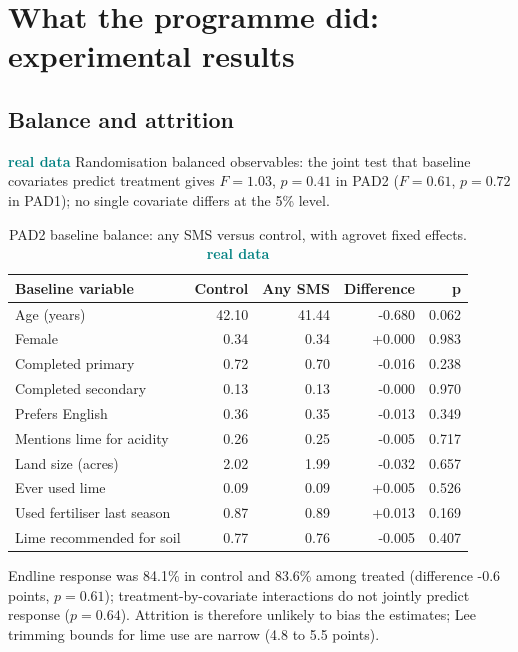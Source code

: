 \documentclass[11pt,a4paper]{article}
\newcommand{\real}{\textcolor{teal}{\sffamily\bfseries real data}}
\begin{document}
\section{What the programme did: experimental results}\label{sec:impact}
\subsection{Balance and attrition}
\real{} Randomisation balanced observables: the joint test that baseline covariates predict treatment gives $F=1.03$, $p=0.41$ in PAD2 ($F=0.61$, $p=0.72$ in PAD1); no single covariate differs at the 5\% level.
\begin{table}[H]\centering\small\setlength{\tabcolsep}{5pt}\begin{tabular}{lrrrr}
\toprule
Baseline variable & Control & Any SMS & Difference & p \\
\midrule
Age (years) & 42.10 & 41.44 & -0.680 & 0.062 \\
Female & 0.34 & 0.34 & +0.000 & 0.983 \\
Completed primary & 0.72 & 0.70 & -0.016 & 0.238 \\
Completed secondary & 0.13 & 0.13 & -0.000 & 0.970 \\
Prefers English & 0.36 & 0.35 & -0.013 & 0.349 \\
Mentions lime for acidity & 0.26 & 0.25 & -0.005 & 0.717 \\
Land size (acres) & 2.02 & 1.99 & -0.032 & 0.657 \\
Ever used lime & 0.09 & 0.09 & +0.005 & 0.526 \\
Used fertiliser last season & 0.87 & 0.89 & +0.013 & 0.169 \\
Lime recommended for soil & 0.77 & 0.76 & -0.005 & 0.407 \\
\bottomrule
\end{tabular}\caption{PAD2 baseline balance: any SMS versus control, with agrovet fixed effects. \real}\end{table}
Endline response was 84.1\% in control and 83.6\% among treated (difference -0.6 points, $p=0.61$); treatment-by-covariate interactions do not jointly predict response ($p=0.64$). Attrition is therefore unlikely to bias the estimates; Lee trimming bounds for lime use are narrow (4.8 to 5.5 points).
\end{document}
